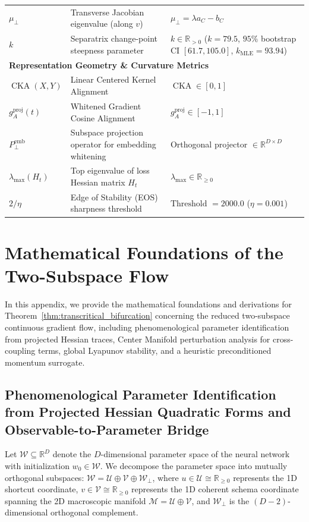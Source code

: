 \documentclass{article}
\theoremstyle{plain}
\theoremstyle{definition}
\DeclareMathOperator{\CKA}{CKA}
\begin{document}
\begin{table}[h]
\begin{small}
\begin{tabular}{lll}
$\mu_{\perp}$ & Transverse Jacobian eigenvalue (along $v$) & $\mu_{\perp} = \lambda a_C - b_C$ \\
$k$ & Separatrix change-point steepness parameter & $k \in \mathbb{R}_{> 0}$ ($k = 79.5$, $95\%$ bootstrap CI $[61.7, 105.0]$, $k_{\text{MLE}} = 93.94$) \\
\multicolumn{3}{l}{\textbf{Representation Geometry \& Curvature Metrics}} \\
$\CKA(X, Y)$ & Linear Centered Kernel Alignment & $\CKA \in [0, 1]$ \\
$g_A^{\text{proj}}(t)$ & Whitened Gradient Cosine Alignment & $g_A^{\text{proj}} \in [-1, 1]$ \\
$P_{\perp}^{\text{emb}}$ & Subspace projection operator for embedding whitening & Orthogonal projector $\in \mathbb{R}^{D \times D}$ \\
$\lambda_{\text{max}}(H_t)$ & Top eigenvalue of loss Hessian matrix $H_t$ & $\lambda_{\text{max}} \in \mathbb{R}_{\ge 0}$ \\
$2/\eta$ & Edge of Stability (EOS) sharpness threshold & $\text{Threshold } = 2000.0$ ($\eta = 0.001$) \\
\bottomrule
\end{tabular}
\end{small}
\end{table}

\section{Mathematical Foundations of the Two-Subspace Flow}
\label{sec:appendix_proof}

In this appendix, we provide the mathematical foundations and derivations for Theorem~\ref{thm:transcritical_bifurcation} concerning the reduced two-subspace continuous gradient flow, including phenomenological parameter identification from projected Hessian traces, Center Manifold perturbation analysis for cross-coupling terms, global Lyapunov stability, and a heuristic preconditioned momentum surrogate.
\subsection{Phenomenological Parameter Identification from Projected Hessian Quadratic Forms and Observable-to-Parameter Bridge}
\label{sec:app_hessian_derivation}
Let $\mathcal{W} \subseteq \mathbb{R}^D$ denote the $D$-dimensional parameter space of the neural network with initialization $w_0 \in \mathcal{W}$. We decompose the parameter space into mutually orthogonal subspaces: $\mathcal{W} = \mathcal{U} \oplus \mathcal{V} \oplus \mathcal{W}_\perp$, where $u \in \mathcal{U} \cong \mathbb{R}_{\ge 0}$ represents the 1D shortcut coordinate, $v \in \mathcal{V} \cong \mathbb{R}_{\ge 0}$ represents the 1D coherent schema coordinate spanning the 2D macroscopic manifold $\mathcal{M} = \mathcal{U} \oplus \mathcal{V}$, and $\mathcal{W}_\perp$ is the $(D-2)$-dimensional orthogonal complement.
\end{document}
